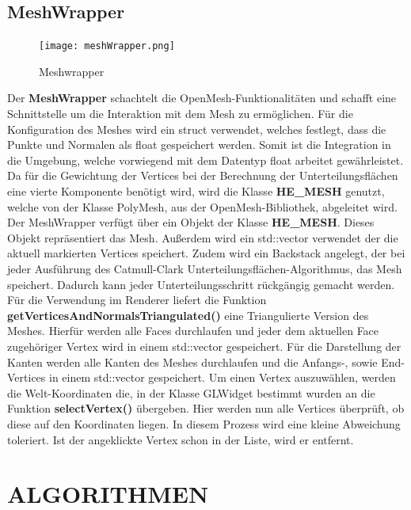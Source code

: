 \subsection{MeshWrapper}

\begin{figure}[H]
\centering
\texttt{[image: meshWrapper.png]}
\caption{Meshwrapper}
\label{fig8}
\end{figure}

\noindent Der \textbf{MeshWrapper} schachtelt die OpenMesh-Funktionalitäten und schafft eine Schnittstelle um die Interaktion mit dem Mesh zu ermöglichen. Für die Konfiguration des Meshes wird ein struct verwendet, welches festlegt, dass die Punkte und Normalen als float gespeichert werden. Somit ist die Integration in die Umgebung, welche vorwiegend mit dem Datentyp float arbeitet gewährleistet. Da für die Gewichtung der Vertices bei der Berechnung der Unterteilungsflächen eine vierte Komponente benötigt wird, wird die Klasse \textbf{HE\_MESH} genutzt, welche von der Klasse PolyMesh, aus der OpenMesh-Bibliothek, abgeleitet wird.\newline
Der MeshWrapper verfügt über ein Objekt der Klasse \textbf{HE\_MESH}. Dieses Objekt repräsentiert das Mesh. Außerdem wird ein std::vector verwendet der die aktuell markierten Vertices speichert. Zudem wird ein Backstack angelegt, der bei jeder Ausführung des Catmull-Clark Unterteilungsflächen-Algorithmus, das Mesh speichert. Dadurch kann jeder Unterteilungsschritt rückgängig gemacht werden.\newline
Für die Verwendung im Renderer liefert die Funktion \textbf{getVerticesAndNormalsTriangulated()} eine Triangulierte Version des Meshes. Hierfür werden alle Faces durchlaufen und jeder dem aktuellen Face zugehöriger Vertex wird in einem std::vector gespeichert.\newline
Für die Darstellung der Kanten werden alle Kanten des Meshes durchlaufen und die Anfangs-, sowie End-Vertices in einem std::vector gespeichert.\newline
Um einen Vertex auszuwählen, werden die Welt-Koordinaten die, in der Klasse GLWidget bestimmt wurden an die Funktion \textbf{selectVertex()} übergeben. Hier werden nun alle Vertices überprüft, ob diese auf den Koordinaten liegen. In diesem Prozess wird eine kleine Abweichung toleriert. Ist der angeklickte Vertex schon in der Liste, wird er entfernt.

\newpage

	\section{\Large ALGORITHMEN}

